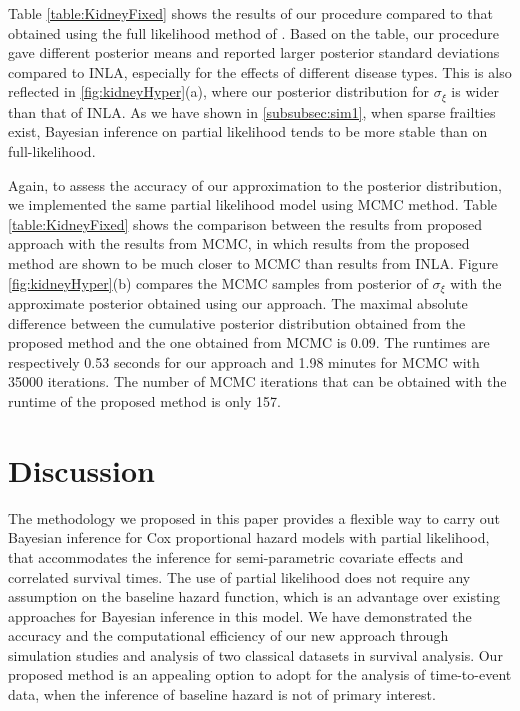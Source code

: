 \documentclass[ba]{imsart}
\begin{document}
Table \ref{table:KidneyFixed} shows the results of our procedure compared to that obtained using the full likelihood method of \cite{inlacoxph}. Based on the table, our procedure gave different posterior means and reported larger posterior standard deviations compared to INLA, especially for the effects of different disease types. This is also reflected in \ref{fig:kidneyHyper}(a), where our posterior distribution for $\sigma_{\xi}$ is wider than that of INLA. As we have shown in \ref{subsubsec:sim1}, when sparse frailties exist, Bayesian inference on partial likelihood tends to be more stable than on full-likelihood.

Again, to assess the accuracy of our approximation to the posterior distribution, we implemented the same partial likelihood model using MCMC method. Table \ref{table:KidneyFixed} shows the comparison between the results from proposed approach with the results from MCMC, in which results from the proposed method are shown to be much closer to MCMC than results from INLA.
Figure \ref{fig:kidneyHyper}(b) compares the MCMC samples from posterior of $\sigma_{\xi}$ with the approximate posterior obtained using our approach. The maximal absolute difference between the cumulative posterior distribution obtained from the proposed method and the one obtained from MCMC is 0.09. The runtimes are respectively 0.53 seconds for our approach and 1.98 minutes for MCMC with 35000 iterations. The number of MCMC iterations that can be obtained with the runtime of the proposed method is only 157.

\section{Discussion}\label{sec:discussion}


The methodology we proposed in this paper provides a flexible way to carry out Bayesian inference for Cox proportional hazard models with partial likelihood, that accommodates the inference for semi-parametric covariate effects and correlated survival times. The use of partial likelihood does not require any assumption on the baseline hazard function, which is an advantage over existing approaches for Bayesian inference in this model. We have demonstrated the accuracy and the computational efficiency of our new approach through simulation studies and analysis of two classical datasets in survival analysis. Our proposed method is an appealing option to adopt for the analysis of time-to-event data, when the inference of baseline hazard is not of primary interest.
\end{document}
